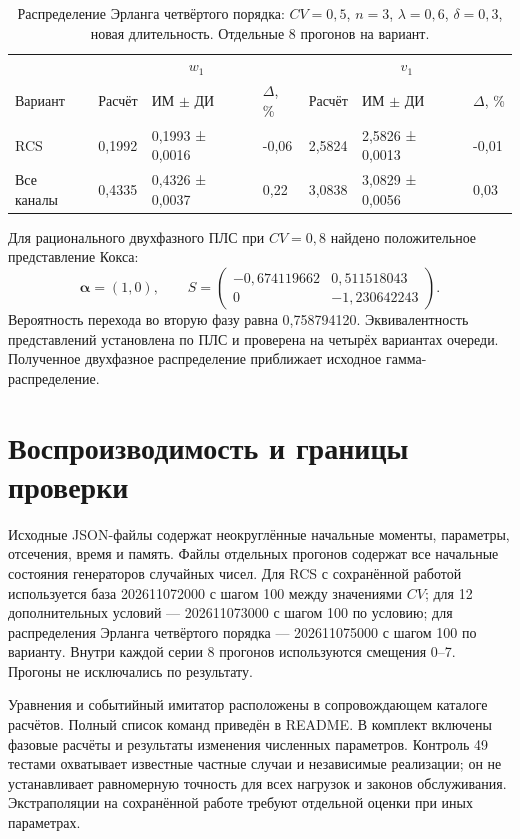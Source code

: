 \documentclass[a4paper,12pt]{article}
\begin{document}
\begin{table}[!htbp]
\centering\small\setlength{\tabcolsep}{2pt}
\begin{tabular}{@{}p{4.16cm}p{1.61cm}p{2.83cm}p{1.28cm}p{1.61cm}p{2.83cm}p{1.28cm}@{}}
\toprule
 & \multicolumn{3}{c}{$w_1$} & \multicolumn{3}{c}{$v_1$} \\
Вариант & Расчёт & ИМ $\pm$ ДИ & $\Delta$, \% & Расчёт & ИМ $\pm$ ДИ & $\Delta$, \% \\
\midrule
RCS & 0,1992 & 0,1993 ± 0,0016 & -0,06 & 2,5824 & 2,5826 ± 0,0013 & -0,01 \\
Все каналы & 0,4335 & 0,4326 ± 0,0037 & 0,22 & 3,0838 & 3,0829 ± 0,0056 & 0,03 \\
\bottomrule
\end{tabular}
\caption{Распределение Эрланга четвёртого порядка: \(CV=0{,}5\), \(n=3\), \(\lambda=0{,}6\), \(\delta=0{,}3\), новая длительность. Отдельные 8 прогонов на вариант.}
\label{tab:erlang}
\end{table}

Для рационального двухфазного ПЛС при \(CV=0{,}8\) найдено положительное представление Кокса:
\[
\boldsymbol\alpha=(1,0),\qquad
S=\begin{pmatrix}-0{,}674119662&0{,}511518043\\0&-1{,}230642243\end{pmatrix}.
\]
Вероятность перехода во вторую фазу равна 0{,}758794120. Эквивалентность представлений установлена по ПЛС и проверена на четырёх вариантах очереди. Полученное двухфазное распределение приближает исходное гамма-распределение.

\section{Воспроизводимость и границы проверки}
Исходные JSON-файлы содержат неокруглённые начальные моменты, параметры, отсечения, время и память. Файлы отдельных прогонов содержат все начальные состояния генераторов случайных чисел. Для RCS с сохранённой работой используется база 202611072000 с шагом 100 между значениями \(CV\); для 12 дополнительных условий --- 202611073000 с шагом 100 по условию; для распределения Эрланга четвёртого порядка --- 202611075000 с шагом 100 по варианту. Внутри каждой серии 8 прогонов используются смещения 0--7. Прогоны не исключались по результату.

Уравнения и событийный имитатор расположены в сопровождающем каталоге расчётов. Полный список команд приведён в README. В комплект включены фазовые расчёты и результаты изменения численных параметров. Контроль 49 тестами охватывает известные частные случаи и независимые реализации; он не устанавливает равномерную точность для всех нагрузок и законов обслуживания. Экстраполяции на сохранённой работе требуют отдельной оценки при иных параметрах.
\end{document}
